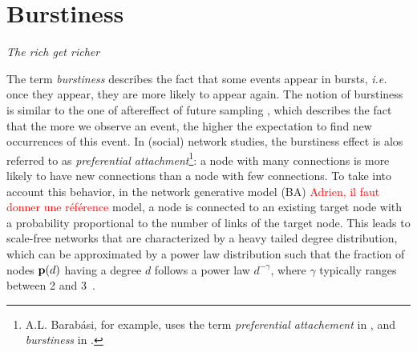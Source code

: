 \section{Burstiness}
\label{sec:burstiness}
\vspace{-0.2cm}
\begin{center} \emph{The rich get richer} \end{center}

\vspace{0.1cm}

The term \textit{burstiness} describes the fact that some events appear in bursts, \textit{i.e.} once they appear, they are more likely to appear again. The notion of burstiness is similar to the one of aftereffect of future sampling \cite{feller_68}, which describes the fact that the more we observe an event, the higher the expectation to find new occurrences of this event. In (social) network studies, the burstiness effect is alos referred to as \textit{preferential attachment}\footnote{A.L. Barab\'asi, for example, uses the term \textit{preferential attachement} in \cite{barabasi1999emergence}, and \textit{burstiness} in \cite{barabasi_burst}.}: a node with many connections is more likely to have new connections than a node with few connections. To take into account this behavior, in the network generative model  (BA) \textcolor{red}{Adrien, il faut donner une r\'ef\'erence} model, a node is connected to an existing target node with a probability proportional to the number of links of the target node. This leads to scale-free networks that are characterized by a heavy tailed degree distribution, which can be approximated by a power law distribution such that the fraction of nodes $\mathbf{p}(d)$ having a degree $d$ follows a power law $d^{-\gamma}$, where $\gamma$ typically ranges between 2 and 3~\cite{barabasi1999emergence}. 

